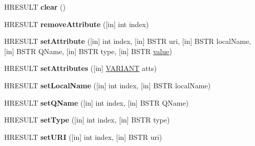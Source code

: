\begin{DoxyCompactItemize}
H\+R\+E\+S\+U\+LT {\bfseries clear} ()
\item 
\mbox{\label{interface_m_s_x_m_l2_1_1_i_m_x_attributes_a39d0193fbe46abfbe5c11244e5a8db18}} 
H\+R\+E\+S\+U\+LT {\bfseries remove\+Attribute} (\mbox{[}in\mbox{]} int index)
\item 
\mbox{\label{interface_m_s_x_m_l2_1_1_i_m_x_attributes_a1c638e41e142d66d013d0a0b0ccb3c07}} 
H\+R\+E\+S\+U\+LT {\bfseries set\+Attribute} (\mbox{[}in\mbox{]} int index, \mbox{[}in\mbox{]} B\+S\+TR uri, \mbox{[}in\mbox{]} B\+S\+TR local\+Name, \mbox{[}in\mbox{]} B\+S\+TR Q\+Name, \mbox{[}in\mbox{]} B\+S\+TR type, \mbox{[}in\mbox{]} B\+S\+TR \hyperlink{unionvalue}{value})
\item 
\mbox{\label{interface_m_s_x_m_l2_1_1_i_m_x_attributes_a8f09bc4910315612e54d2202df352ae9}} 
H\+R\+E\+S\+U\+LT {\bfseries set\+Attributes} (\mbox{[}in\mbox{]} \hyperlink{structtag_v_a_r_i_a_n_t}{V\+A\+R\+I\+A\+NT} atts)
\item 
\mbox{\label{interface_m_s_x_m_l2_1_1_i_m_x_attributes_a6d57f29035968575fa6230429fc587ab}} 
H\+R\+E\+S\+U\+LT {\bfseries set\+Local\+Name} (\mbox{[}in\mbox{]} int index, \mbox{[}in\mbox{]} B\+S\+TR local\+Name)
\item 
\mbox{\label{interface_m_s_x_m_l2_1_1_i_m_x_attributes_a232d41e67270e99da873bc3f833eeecd}} 
H\+R\+E\+S\+U\+LT {\bfseries set\+Q\+Name} (\mbox{[}in\mbox{]} int index, \mbox{[}in\mbox{]} B\+S\+TR Q\+Name)
\item 
\mbox{\label{interface_m_s_x_m_l2_1_1_i_m_x_attributes_af1da4296dc2d6d00330a4c93ad6a3c26}} 
H\+R\+E\+S\+U\+LT {\bfseries set\+Type} (\mbox{[}in\mbox{]} int index, \mbox{[}in\mbox{]} B\+S\+TR type)
\item 
\mbox{\label{interface_m_s_x_m_l2_1_1_i_m_x_attributes_a41517821f9ec6fa527e76a20104fbba2}} 
H\+R\+E\+S\+U\+LT {\bfseries set\+U\+RI} (\mbox{[}in\mbox{]} int index, \mbox{[}in\mbox{]} B\+S\+TR uri)
\item 

\end{DoxyCompactItemize}

